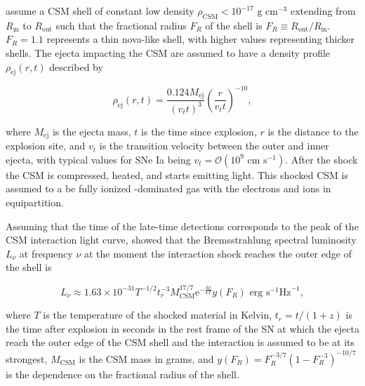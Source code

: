 \documentclass[a4paper,oneside,12pt, class=Latex/Classes/PhDthesisPSnPDF, crop=false]{standalone}
\begin{document}
\citet{CSM_models_Harris} assume a CSM shell of constant low density $\rho_\text{CSM} < 10^{-17} \text{ g cm}^{-3}$ extending from $R_\text{in}$ to $R_\text{out}$ such that the fractional radius $F_R$ of the shell is $F_R \equiv R_\text{out} / R_\text{in}$. $F_R = 1.1$ represents a thin nova-like shell, with higher values representing thicker shells. The ejecta impacting the CSM are assumed to have a density profile $\rho_\text{ej} (r, t)$ described by

\begin{equation}
    \rho_\text{ej} (r, t) = \frac{0.124M_\text{ej}}{(v_t t)^3}\left(\frac{r}{v_t t}\right)^{-10},
\end{equation}

where $M_\text{ej}$ is the ejecta mass, $t$ is the time since explosion, $r$ is the distance to the explosion site, and $v_t$ is the transition velocity between the outer and inner ejecta, with typical values for SNe Ia being $v_t = \mathcal{O}(10^9\text{ cm s}^{-1})$. After the shock the CSM is compressed, heated, and starts emitting light. This shocked CSM is assumed to a be fully ionized -dominated gas with the electrons and ions in equipartition.

Assuming that the time of the late-time detections corresponds to the peak of the CSM interaction light curve, \citet{2015cp} showed that the Bremsstrahlung spectral luminosity $L_\nu$ at frequency $\nu$ at the moment the interaction shock reaches the outer edge of the shell is

\begin{equation}
    \label{15cp_L_nu}
    L_\nu \approx 1.63 \times 10^{-31} T^{-1/2} t_r^{-3} M_\text{CSM}^{17/7} \text{e}^{-\frac{h\nu}{kT}} y(F_R) \text{ erg s}^{-1}\text{Hz}^{-1},
\end{equation}

where $T$ is the temperature of the shocked material in Kelvin, $t_r = t/(1+z)$ is the time after explosion in seconds in the rest frame of the SN at which the ejecta reach the outer edge of the CSM shell and the interaction is assumed to be at its strongest, $M_\text{CSM}$ is the CSM mass in grams, and $y(F_R) = F_R^{-3/7}(1-F_R^{-3})^{-10/7}$ is the dependence on the fractional radius of the shell.%
\end{document}
